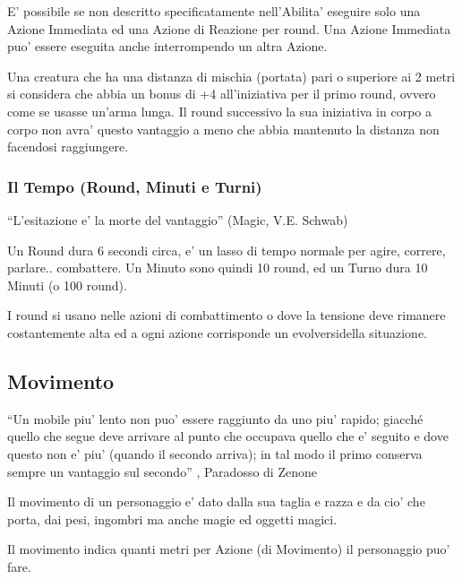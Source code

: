 \documentclass[a4paper,11pt,twoside,openany]{dndbook}
\begin{document}
E' possibile se non descritto specificatamente nell'Abilita' eseguire solo una Azione Immediata ed una Azione di Reazione per round. Una Azione Immediata puo' essere eseguita anche interrompendo un altra Azione.

Una creatura che ha una distanza di mischia (portata) pari o superiore
ai 2 metri si considera che abbia un bonus di +4 all'iniziativa per
il primo round, ovvero come se usasse un'arma lunga. Il round successivo
la sua iniziativa in corpo a corpo non avra' questo vantaggio a meno
che abbia mantenuto la distanza non facendosi raggiungere.

\subsubsection{Il Tempo (Round, Minuti e Turni)}

\label{il-tempo-round-minuti-e-turni}
\begin{quotebox}
``L'esitazione e' la morte del vantaggio'' (Magic, V.E. Schwab)
\end{quotebox}

Un Round dura 6 secondi circa, e' un lasso di tempo normale per agire, correre, parlare.. combattere. Un Minuto sono quindi 10 round, ed un Turno dura 10 Minuti (o 100 round).

I round si usano nelle azioni di combattimento o dove la tensione deve rimanere costantemente alta ed a ogni azione corrisponde un evolversidella situazione.

\pagebreak

\subsection{Movimento}

\label{movimento}

\begin{quotebox}``Un mobile piu' lento non puo' essere raggiunto da uno piu' rapido; giacché quello che segue deve arrivare al punto che occupava quello che e' seguito e dove questo non e' piu' (quando il secondo arriva); in tal modo il primo conserva sempre un vantaggio sul secondo'' , Paradosso di Zenone
\end{quotebox}

Il movimento di un personaggio e' dato dalla sua taglia e razza e da cio' che porta, dai pesi, ingombri ma anche magie ed oggetti magici.

Il movimento indica quanti metri per Azione (di Movimento) il personaggio puo' fare.
\end{document}
